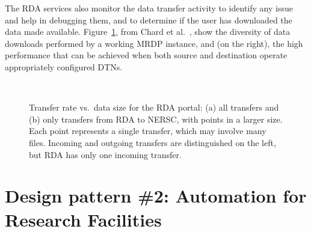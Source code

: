 \documentclass[10pt]{article}
\begin{document}
The RDA services also monitor the data transfer activity to identify any issue and help in debugging them, and to determine if the user has downloaded the data made available. 
Figure~\ref{fig:sizetime}, from Chard et al.~\cite{MBRDP}, show the diversity of data downloads
performed by a working MRDP instance, and (on the right), the high performance that can be
achieved when both source and destination operate appropriately configured DTNs. 

  \begin{figure}[t]
  \centering
    \\

  \vspace{1ex}
  
\caption{Transfer rate vs.\ data size for the RDA portal:
(a) all transfers and 
(b) only transfers from RDA to NERSC, with points 
in a larger size.
Each point represents a single transfer, which may involve many files.
Incoming and outgoing transfers are distinguished on the left, but
RDA has only one incoming transfer.
}
\label{fig:sizetime}
\end{figure}



\section*{Design pattern \#2: Automation for Research Facilities}
\end{document}
